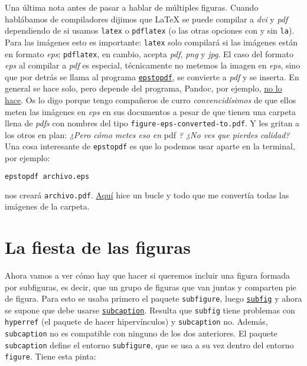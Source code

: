 Una última nota antes de pasar a hablar de múltiples figuras. Cuando
hablábamos de compiladores dijimos que LaTeX se puede compilar a
\emph{dvi} y \emph{pdf} dependiendo de si usamos \lstinline!latex! o
\lstinline!pdflatex! (o las otras opciones con y sin \lstinline!la!).
Para las imágenes esto es importante: \lstinline!latex! solo compilará
si las imágenes están en formato \emph{eps}; \lstinline!pdflatex!, en
cambio, acepta \emph{pdf}, \emph{png} y \emph{jpg}. El caso del formato
\emph{eps} al compilar a \emph{pdf} es especial, técnicamente no metemos
la imagen en \emph{eps}, sino que por detrás se llama al programa
\href{https://www.ctan.org/pkg/epstopdf}{\lstinline!epstopdf!}, se
convierte a \emph{pdf} y se inserta. En general se hace solo, pero
depende del programa, Pandoc, por ejemplo,
\href{https://github.com/jgm/pandoc/commit/a9628d0745784f6f99edfca008d64dcffeb74bc8}{no
lo hace}. Os lo digo porque tengo compañeros de curro
\emph{convencidísimos} de que ellos meten las imágenes en \emph{eps} en
sus documentos a pesar de que tienen una carpeta llena de \emph{pdfs}
con nombres del tipo \lstinline!figure-eps-converted-to.pdf!. Y les
gritan a los otros en plan: \emph{¿Pero cómo metes eso en} pdf \emph{?
¿No ves que pierdes calidad?} Una cosa interesante de
\lstinline!epstopdf! es que lo podemos usar aparte en la terminal, por
ejemplo:

\begin{lstlisting}[language=bash]
epstopdf archivo.eps
\end{lstlisting}

nos creará \lstinline!archivo.pdf!.
\href{https://ondahostil.wordpress.com/2016/05/31/lo-que-he-aprendido-bucle-para-pasar-de-eps-a-pdf-en-cmd/}{Aquí}
hice un bucle y todo que me convertía todas las imágenes de la carpeta.

\section{La fiesta de las figuras}\label{sec:fiestaFiguras}

Ahora vamos a ver cómo hay que hacer si queremos incluir una figura
formada por subfiguras, es decir, que un grupo de figuras que van juntas
y comparten pie de figura. Para esto se usaba primero el paquete
\lstinline!subfigure!, luego
\href{http://www.ctan.org/pkg/subfig}{\lstinline!subfig!} y ahora se
supone que debe usarse
\href{https://www.ctan.org/pkg/subcaption}{\lstinline!subcaption!}.
Resulta que \lstinline!subfig! tiene problemas con \lstinline!hyperref!
(el paquete de hacer hipervínculos) y \lstinline!subcaption! no. Además,
\lstinline!subcaption! no es compatible con ninguno de los dos
anteriores. El paquete \lstinline!subcaption! define el entorno
\lstinline!subfigure!, que se usa a su vez dentro del entorno
\lstinline!figure!. Tiene esta pinta:

